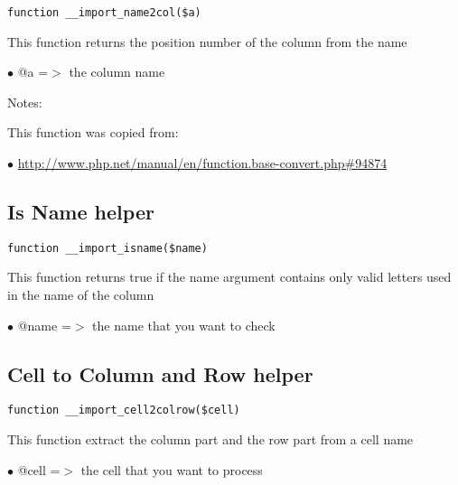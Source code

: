 \documentclass[a4paper]{book}
\def\htmladdnormallink#1#2{\href{#2}{#1}}
\begin{document}
\begin{lstlisting}
function __import_name2col($a)
\end{lstlisting}

This function returns the position number of the column from the name

\begin{compactitem}
\item[\color{myblue}$\bullet$] @a =$>$ the column name
\end{compactitem}

Notes:

This function was copied from:

\begin{compactitem}
\item[\color{myblue}$\bullet$] \htmladdnormallink{http://www.php.net/manual/en/function.base-convert.php\#94874}{http://www.php.net/manual/en/function.base-convert.php\#94874}
\end{compactitem}

\hypertarget{toc177}{}
\subsection{Is Name helper}

\begin{lstlisting}
function __import_isname($name)
\end{lstlisting}

This function returns true if the name argument contains only valid letters
used in the name of the column

\begin{compactitem}
\item[\color{myblue}$\bullet$] @name =$>$ the name that you want to check
\end{compactitem}

\hypertarget{toc178}{}
\subsection{Cell to Column and Row helper}

\begin{lstlisting}
function __import_cell2colrow($cell)
\end{lstlisting}

This function extract the column part and the row part from a cell name

\begin{compactitem}
\item[\color{myblue}$\bullet$] @cell =$>$ the cell that you want to process
\end{compactitem}
\end{document}
